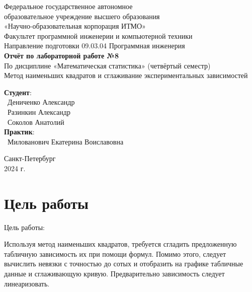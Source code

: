 \documentclass{article}
\begin{document}
\begin{center}
    \Large
    Федеральное государственное автономное \\
    образовательное учреждение высшего образования \\ 
    «Научно-образовательная корпорация ИТМО»\\
    \vspace{0.5cm}
    \large
    Факультет программной инженерии и компьютерной техники \\
    Направление подготовки 09.03.04 Программная инженерия \\
    \vspace{1cm}
    \Large
    \textbf{Отчёт по лабораторной работе №8} \\
    По дисциплине «Математическая статистика» (четвёртый семестр)\\
    Метод наименьших квадратов и сглаживание
экспериментальных зависимостей\\
    \large
    \vspace{8cm}

    \begin{minipage}{.33\textwidth}
    \end{minipage}
    \hfill
    \begin{minipage}{.4\textwidth}
    
        \textbf{Студент}: \vspace{.1cm} \\
        \ Дениченко Александр\\
        \ Разинкин Александр\\
        \ Соколов Анатолий\\
        \textbf{Практик}:  \\
        \ Милованович Екатерина Воиславовна
    \end{minipage}
    \vfill
Санкт-Петербург\\ 2024 г.
\end{center}
\thispagestyle{empty}

\newpage
\section*{Цель работы}
Цель работы:

Используя метод наименьших квадратов, требуется сгладить
предложенную табличную зависимость их при помощи формул. 
Помимо этого, следует вычислить невязки с точностью до сотых и отобразить на графике табличные данные и сглаживающую кривую. 
Предварительно зависимость следует линеаризовать.
\end{document}
